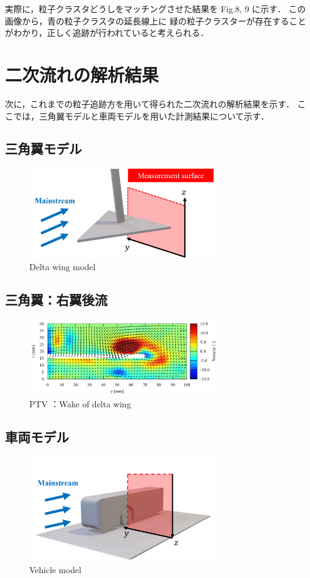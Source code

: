 \documentclass[twocolumn,a4j]{jsarticle}
\begin{document}
実際に，粒子クラスタどうしをマッチングさせた結果を Fig.8, 9 に示す．
この画像から，青の粒子クラスタの延長線上に
緑の粒子クラスターが存在することがわかり，正しく追跡が行われていると考えられる．

\section{二次流れの解析結果}
次に，これまでの粒子追跡方を用いて得られた二次流れの解析結果を示す．
ここでは，三角翼モデルと車両モデルを用いた計測結果について示す．


\subsection{三角翼モデル}
\begin{figure}[htbp]
	\centering
	\includegraphics[keepaspectratio, width=80mm]{../images/delta_wing_model.png}
	\caption{Delta wing model}
\end{figure}


\subsection{三角翼：右翼後流}
\begin{figure}[htbp]
	\centering
	\includegraphics[keepaspectratio, width=82mm]{../images/delta_wing.png}
	\caption{PTV ：Wake of delta wing}
\end{figure}

\subsection{車両モデル}
\begin{figure}[htbp]
	\centering
	\includegraphics[keepaspectratio, width=80mm]{../images/vehicle_model.png}
	\caption{Vehicle model}
\end{figure}
\end{document}
